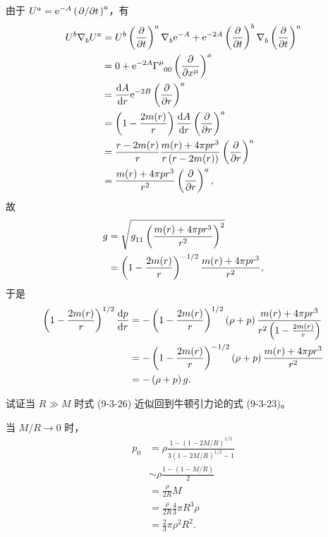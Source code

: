 \begin{xiti}
	\begin{zm}
		由于 $\tensor{U}{^a} = \e{-A} \tensor{\left( \pdv*{t} \right)}{^a}$，有
		\begin{align*}
			\tensor{U}{^b} \tensor{\nabla}{_b} \tensor{U}{^a} &= \tensor{U}{^b} \tensor{\left( \pdv{t} \right)}{^a} \Nabla{b} \e{-A} + \e{-2A} \tensor{\left( \pdv{t} \right)}{^b} \Nabla{b} \tensor{\left( \pdv{t} \right)}{^a}\\
			&= 0 + \e{-2A} \ChristoffelSymbol{\mu}{0}{0} \tensor{\left( \pdv{x^\mu} \right)}{^a}\\
			&= \dv{A}{r} \e{-2B} \tensor{\left( \pdv{r} \right)}{^a}\\
			&= \left( 1- \frac{2m(r)}{r} \right) \dv{A}{r} \tensor{\left( \pdv{r} \right)}{^a}\\
			&= \frac{r - 2m(r)}{r} \frac{m(r) + 4 \pi p r^3}{r \left( r - 2 m(r) \right)} \tensor{\left( \pdv{r} \right)}{^a}\\
			&= \frac{m(r) + 4 \pi p r^3}{r^2} \tensor{\left( \pdv{r} \right)}{^a},
		\end{align*}
		故
		\begin{align*}
			g &= \sqrt{\tensor{g}{_1_1} \left( \frac{m(r) + 4 \pi p r^3}{r^2} \right)^2}\\
			&= \left( 1 - \frac{2 m(r)}{r} \right)^{-1/2} \frac{m(r) + 4 \pi p r^3}{r^2},
		\end{align*}
		于是
		\begin{align*}
			\left( 1 - \frac{2 m(r)}{r} \right)^{1/2} \dv{p}{r} &= - \left( 1 - \frac{2 m(r)}{r} \right)^{1/2} \left( \rho + p \right) \frac{m(r) + 4 \pi p r^3}{r^2 \left( 1 - \frac{2 m(r)}{r} \right)}\\
			&= - \left( 1 - \frac{2 m(r)}{r} \right)^{-1/2} \left( \rho + p \right) \frac{m(r) + 4 \pi p r^3}{r^2}\\
			&= - \left( \rho + p \right) g.
		\end{align*}
	\end{zm}

	\item 试证当 $R \gg M$ 时式 (9-3-26) 近似回到牛顿引力论的式 (9-3-23)。

	\begin{zm}
		当 $M/R \rightarrow 0$ 时，
		\begin{align*}
			p_0 &= \rho \frac{1- \left( 1 - 2 M/R \right)^{1/2}}{3\left( 1- 2 M/R \right)^{1/2} - 1}\\
			&\sim \rho \frac{1 - \left( 1 - M/R \right)}{2}\\
			&= \frac{\rho}{2 R} M\\
			&= \frac{\rho}{2 R} \frac{4}{3} \pi R^3 \rho\\
			&= \frac{2}{3} \pi \rho^2 R^2.
		\end{align*}
	\end{zm}


\end{xiti}
